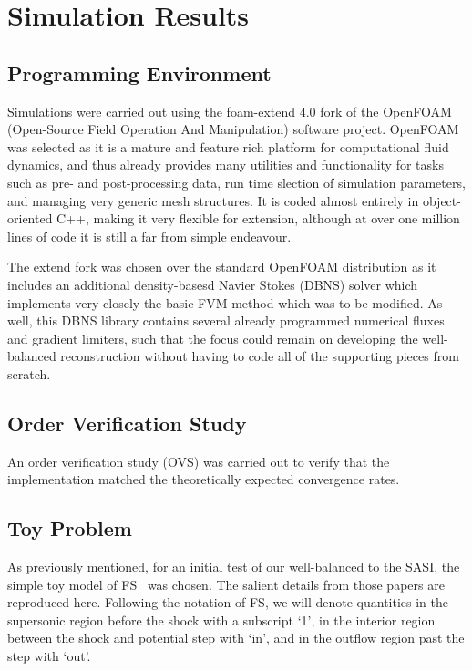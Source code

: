 \chapter{Simulation Results}
\label{chap:results}

\section{Programming Environment}
\label{sec:environment}

Simulations were carried out using the foam-extend 4.0 fork of the OpenFOAM (Open-Source Field Operation And Manipulation) software project. OpenFOAM was selected as it is a mature and feature rich platform for computational fluid dynamics, and thus already provides many utilities and functionality for tasks such as pre- and post-processing data, run time slection of simulation parameters, and managing very generic mesh structures. It is coded almost entirely in object-oriented C++, making it very flexible for extension, although at over one million lines of code it is still a far from simple endeavour.

The extend fork was chosen over the standard OpenFOAM distribution as it includes an additional density-basesd Navier Stokes (DBNS) solver which implements very closely the basic FVM method which was to be modified. As well, this DBNS library contains several already programmed numerical fluxes and gradient limiters, such that the focus could remain on developing the well-balanced reconstruction without having to code all of the supporting pieces from scratch.


\section{Order Verification Study}
\label{sec:OVS}

An order verification study (OVS) was carried out to verify that the implementation matched the theoretically expected convergence rates.


\section{Toy Problem}
\label{sec:toyProblem}

As previously mentioned, for an initial test of our well-balanced  to the SASI, the simple toy model of FS~\cite{Foglizzo2009,Sato2009} was chosen. The salient details from those papers  are reproduced here. Following the notation of FS, we will denote quantities in the supersonic region before the shock with a subscript `1', in the interior region between the shock and potential step with `in', and in the outflow region past the step with `out'.

